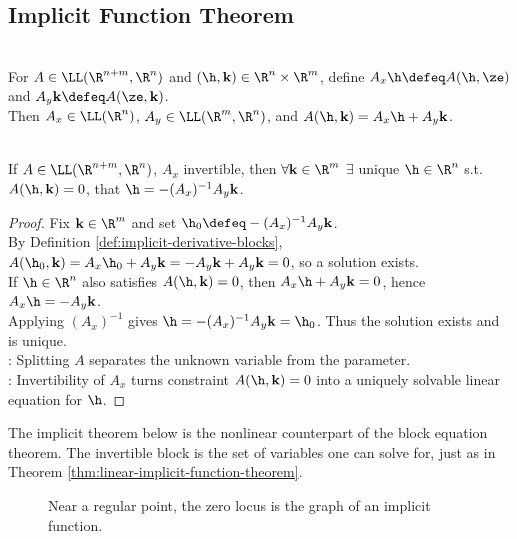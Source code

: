 \subsection{Implicit Function Theorem}

\begin{definition} \label{def:implicit-derivative-blocks} \\
For $A\in\LL(\R^{n+m},\R^n)$ and $(\h,\mathbf{k})\in\R^n\times\R^m$, define $A_x\h\defeq A(\h,\ze)$ and $A_y\mathbf{k}\defeq A(\ze,\mathbf{k})$.\\
Then $A_x\in\LL(\R^n)$, $A_y\in\LL(\R^m,\R^n)$, and $A(\h,\mathbf{k})=A_x\h+A_y\mathbf{k}$.
\end{definition}

\begin{theorem} \label{thm:linear-implicit-function-theorem} \\
If $A\in\LL(\R^{n+m},\R^n)$, $A_x$ invertible, then $\forall \mathbf{k}\in\R^m$ $\exists$ unique $\h\in\R^n$ s.t. $A(\h,\mathbf{k})=0$, that $\h=-(A_x)^{-1}A_y\mathbf{k}$.
\begin{proof}
Fix $\mathbf{k}\in\R^m$ and set $\h_0\defeq-(A_x)^{-1}A_y\mathbf{k}$.\\
By Definition \ref{def:implicit-derivative-blocks}, $A(\h_0,\mathbf{k}) =A_x\h_0+A_y\mathbf{k} =-A_y\mathbf{k}+A_y\mathbf{k} =0$, so a solution exists.\\
If $\h\in\R^n$ also satisfies $A(\h,\mathbf{k})=0$, then $A_x\h+A_y\mathbf{k}=0$, hence $A_x\h=-A_y\mathbf{k}$.\\
Applying $(A_x)^{-1}$ gives $\h=-(A_x)^{-1}A_y\mathbf{k}=\h_0$. Thus the solution exists and is unique.\\
: Splitting $A$ separates the unknown variable from the parameter.\\
: Invertibility of $A_x$ turns constraint $A(\h,\mathbf{k})=0$ into a uniquely solvable linear equation for $\h$.
\end{proof}
\end{theorem}

The implicit theorem below is the nonlinear counterpart of the block equation theorem. The invertible block is the set of variables one can solve for, just as in Theorem \ref{thm:linear-implicit-function-theorem}.

\begin{figure}[H]
  \centering
  
  \caption{Near a regular point, the zero locus is the graph of an implicit function.}
  \label{fig:implicit-locus-as-graph}
\end{figure}

